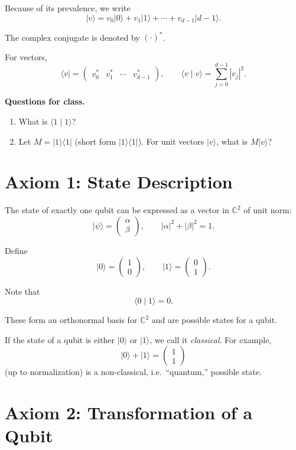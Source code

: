 \documentclass[11pt]{article}
\newcommand{\ket}[1]{\lvert #1\rangle}
\newcommand{\bra}[1]{\langle #1\rvert}
\newcommand{\braket}[2]{\langle #1\mid #2\rangle}
\newcommand{\C}{\mathbb{C}}
\begin{document}
Because of its prevalence, we write
\[
  \ket{v}
  =
  v_0\ket{0}+v_1\ket{1}+\cdots+v_{d-1}\ket{d-1}.
\]

The complex conjugate is denoted by $(\cdot)^*$.

For vectors,
\[
  \bra{v}
  =
  \begin{pmatrix}
    v_0^* & v_1^* & \cdots & v_{d-1}^*
  \end{pmatrix},
\qquad
  \braket{v}{v}
  =
  \sum_{j=0}^{d-1}|v_j|^2.
\]

\textbf{Questions for class.}
\begin{enumerate}
  \item What is $\braket{1}{1}$?
  \item Let $M=\ket{1}\bra{1}$ (short form $|1\rangle\langle1|$).
        For unit vectors $\ket{v}$, what is $M\ket{v}$?
\end{enumerate}

\section{Axiom 1: State Description}

The state of exactly one qubit can be expressed as a vector in $\C^2$
of unit norm:
\[
  \ket{\psi}
  =
  \begin{pmatrix}
    \alpha\\
    \beta
  \end{pmatrix},
  \qquad
  |\alpha|^2+|\beta|^2=1.
\]

Define
\[
  \ket{0}=
  \begin{pmatrix}
    1\\0
  \end{pmatrix},
  \qquad
  \ket{1}=
  \begin{pmatrix}
    0\\1
  \end{pmatrix}.
\]

Note that
\[
  \braket{0}{1}=0.
\]

These form an orthonormal basis for $\C^2$ and are possible states for a qubit.

If the state of a qubit is either $\ket{0}$ or $\ket{1}$, we call it
\emph{classical}. For example,
\[
  \ket{0}+\ket{1}
  =
  \begin{pmatrix}
    1\\1
  \end{pmatrix}
\]
(up to normalization) is a non-classical, i.e.\ ``quantum,'' possible state.

\section{Axiom 2: Transformation of a Qubit}
\end{document}
